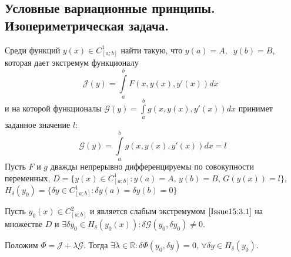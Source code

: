 \subsection{Условные вариационные принципы. Изопериметрическая задача.}
Среди функций $y(x)\in C^1_{[a;b]}$ найти такую, что $y(a)=A,\;\; y(b)=B$, которая дает экстремум функционалу 
\begin{equation}
    \mathcal{J}(y)=\int\limits_a^b F(x,y(x),y'(x))dx\;\;\label{Issue15:3.1}
\end{equation} 
и на которой функционалы $\mathcal{G}(y) = \int\limits_a^b g(x,y(x),y'(x))dx$ принимет заданное значение $l$:
\begin{equation}
    \label{Issue15:3.2}
    \mathcal{G}(y)=\int\limits_a^b g(x,y(x),y'(x))d x=l
\end{equation}
Пусть $F$ и $g$ дважды непрерывно дифференцируемы по совокупности переменных, $D=\{y(x)\in C^1_{[a;b]}:y(a)=A, \, y(b)=B, \, G(y(x))=l\}$,
$H_\delta (y_0)=\{\delta y \in C^1_{[a;b]}:\delta y (a) = \delta  y(b)=0\}$
\begin{theorem}
Пусть $y_0(x)\in C^2_{[a;b]}$ и является слабым экстремумом $\eqref{Issue15:3.1}$ на множестве $D$ и $\exists \delta y_0\in H_\delta (y_0(x)): \delta \mathcal{G}(y_0,\delta y_0)\neq 0.$\par
Положим $\Phi =\mathcal{J}+\lambda\mathcal{G}.$ Тогда $\exists \lambda \in \mathds{R}: \delta \Phi(y_0,\delta y)=0, \,\forall \delta y\in H_\delta(y_0)$.
\end{theorem}
